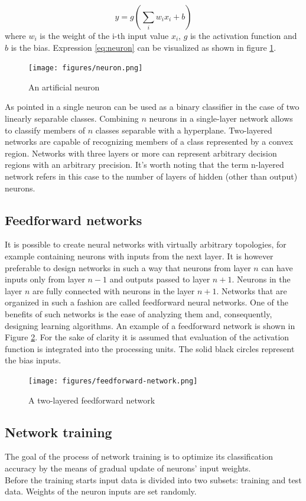 \documentclass[11pt,oneside, a4paper]{report}
\begin{document}
\begin{equation} \label{eq:neuron}
y = g(\sum_{i} w_i x_i + b)
\end{equation}
where $w_i$ is the weight of the i-th input value $x_i$, $g$ is the activation function and $b$ is the bias. Expression \ref{eq:neuron} can be visualized as shown in figure \ref{fig:neuron}.

\begin{figure}[htp]
\centering
\texttt{[image: figures/neuron.png]}
\caption{An artificial neuron}
\label{fig:neuron}
\end{figure}

As pointed in \cite{BISHOP1995} a single neuron can be used as a binary classifier in the case of two linearly separable classes. Combining $n$ neurons in a single-layer network allows to classify members of $n$ classes separable with a hyperplane. Two-layered networks are capable of recognizing members of a class represented by a convex region. Networks with three layers or more can represent arbitrary decision regions with an arbitrary precision.
It's worth noting that the term n-layered network refers in this case to the number of layers of hidden (other than output) neurons.

\subsection{Feedforward networks}
It is possible to create neural networks with virtually arbitrary topologies, for example containing neurons with inputs from the next layer. It is however preferable to design networks in such a way that neurons from layer $n$ can have inputs only from layer $n-1$ and outputs passed to layer $n+1$. Neurons in the layer $n$ are fully connected with neurons in the layer $n+1$. Networks that are organized in such a fashion are called feedforward neural networks. One of the benefits of such networks is the ease of analyzing them and, consequently, designing learning algorithms. 
An example of a feedforward network is shown in Figure \ref{fig:feedforward-network}. For the sake of clarity it is assumed that evaluation of the activation function is integrated into the processing units. The solid black circles represent the bias inputs.
\begin{figure}[htp]
\centering
\texttt{[image: figures/feedforward-network.png]}
\caption{A two-layered feedforward network}
\label{fig:feedforward-network}
\end{figure}

\subsection{Network training}\label{ssec:network-training}
The goal of the process of network training is to optimize its classification accuracy by the means of gradual update of neurons' input weights.
\\
Before the training starts input data is divided into two subsets: training and test data. Weights of the neuron inputs are set randomly.
\\
\end{document}
